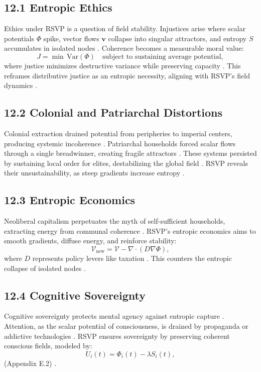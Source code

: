 \documentclass[12pt]{article}
\begin{document}
\subsection*{12.1 Entropic Ethics}
Ethics under RSVP is a question of field stability. Injustices arise where scalar potentials \(\Phi\) spike, vector flows \(\mathbf{v}\) collapse into singular attractors, and entropy \(S\) accumulates in isolated nodes \citep{shannon1948}. Coherence becomes a measurable moral value:
\[
J = \min \, \mathrm{Var}(\Phi) \quad \text{subject to sustaining average potential},
\]
where justice minimizes destructive variance while preserving capacity \citep{whitehead1978}. This reframes distributive justice as an entropic necessity, aligning with RSVP's field dynamics \citep{gromov1999}.

\subsection*{12.2 Colonial and Patriarchal Distortions}
Colonial extraction drained potential from peripheries to imperial centers, producing systemic incoherence \citep{ortega1957}. Patriarchal households forced scalar flows through a single breadwinner, creating fragile attractors \citep{zuboff2019}. These systems persisted by sustaining local order for elites, destabilizing the global field \citep{deleuze1987}. RSVP reveals their unsustainability, as steep gradients increase entropy \citep{jaynes2003}.

\subsection*{12.3 Entropic Economics}
Neoliberal capitalism perpetuates the myth of self-sufficient households, extracting energy from communal coherence \citep{zuboff2019}. RSVP's entropic economics aims to smooth gradients, diffuse energy, and reinforce stability:
\[
\mathcal{V}_{\text{new}} = \mathcal{V} - \nabla \cdot (D \nabla \Phi),
\]
where \(D\) represents policy levers like taxation \citep{cover2006}. This counters the entropic collapse of isolated nodes \citep{lanier2018}.

\subsection*{12.4 Cognitive Sovereignty}
Cognitive sovereignty protects mental agency against entropic capture \citep{ortega1957}. Attention, as the scalar potential of consciousness, is drained by propaganda or addictive technologies \citep{lanier2018}. RSVP ensures sovereignty by preserving coherent conscious fields, modeled by:
\[
U_i(t) = \Phi_i(t) - \lambda S_i(t),
\]
(Appendix E.2) \citep{hanson2003}.
\end{document}
